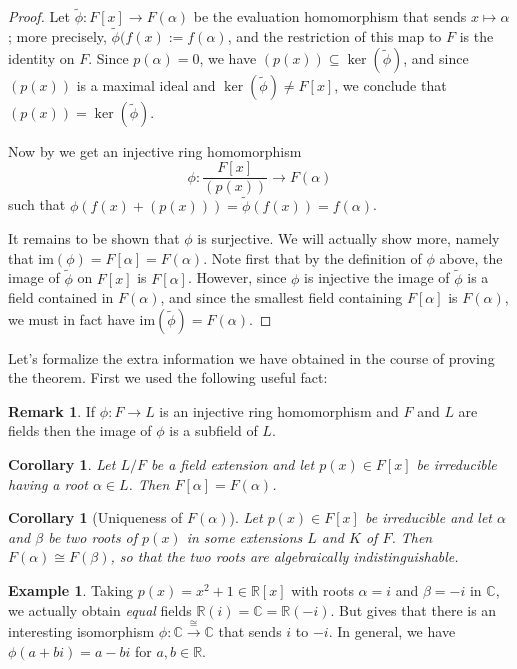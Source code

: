 \documentclass[12pt]{report}
\newtheorem{corollary}[theorem]{Corollary}
\numberwithin{equation}{section}
\numberwithin{theorem}{chapter}
\theoremstyle{definition}
\newtheorem{example}[theorem]{Example}
\newtheorem*{basic properties}{Basic Properties}
\newtheorem*{Important Remark}{Important Remark}
\newtheorem{remark}[theorem]{Remark}
\newcommand{\C}{\mathbb{C}}
\renewcommand{\ker}{\operatorname{ker}}
\begin{document}
\begin{proof}
Let $\tilde{\phi}\!: F[x] \to F(\alpha)$ be the evaluation homomorphism that sends $x \mapsto \alpha$; more precisely, $\tilde{\phi}(f(x) := f(\alpha)$, and the restriction of this map to $F$ is the identity on $F$. Since $p(\alpha)=0$, we have $(p(x)) \subseteq \ker({\tilde{\phi}})$, and since $(p(x))$ is a maximal ideal and $\ker({\tilde{\phi}}) \neq F[x]$, we conclude that $(p(x))=\ker({\tilde{\phi}})$. 

Now by  we get an injective ring homomorphism
$$\phi\!: \frac{F[x]}{(p(x))} \to F(\alpha)$$
such that $\phi(f(x)+(p(x)))=\tilde{\phi}(f(x))=f(\alpha)$.

It remains to be shown that $\phi$ is surjective. We will actually show more, namely that $\mathrm{im}(\phi)=F[\alpha]=F(\alpha)$. Note first that by the definition of $\phi$ above, the image of $\tilde{\phi}$ on $F[x]$ is $F[\alpha]$. However, since $\phi$ is injective the image of $\tilde{\phi}$ is a field contained in $F(\alpha)$, and since the smallest field containing $F[\alpha]$ is $F(\alpha)$, we must in fact have $\mathrm{im}({\tilde{\phi}})=F(\alpha)$.
\end{proof}



Let's formalize the extra information we have obtained in the course of proving the theorem. First we used the following useful fact:

\begin{remark}
If $\phi:F\to L$ is an injective ring homomorphism and $F$ and $L$ are fields then the image of $\phi$ is a subfield of $L$.
\end{remark}


\begin{corollary}
Let $L/F$ be a field extension and let $p(x) \in F[x]$ be irreducible having a root $\alpha \in L$. Then $F[\alpha] = F(\alpha)$.
\end{corollary}

\begin{corollary}[Uniqueness of $F(\alpha)$]\label{uniqueness of F(alpha) roots}
Let $p(x)\in F[x]$ be irreducible and let $\alpha$ and $\beta$ be two roots of $p(x)$ in some extensions $L$ and $K$ of $F$. Then $F(\alpha) \cong F(\beta)$, so that the two roots are algebraically indistinguishable.
\end{corollary}



\begin{example}
Taking $p(x)=x^2+1 \in \mathbb{R}[x]$ with roots $\alpha = i$ and $\beta=-i$ in $\C$, we actually obtain {\em equal} fields $\mathbb{R}(i)=\C=\mathbb{R}(-i)$.
But  gives that there is an interesting isomorphism $\phi: \C \xrightarrow{\, \cong \,} \C$ that sends $i$ to $-i$. In general, we have $\phi(a + b i) = a - bi$ for $a,b \in \mathbb{R}$.
\end{example}
\end{document}
